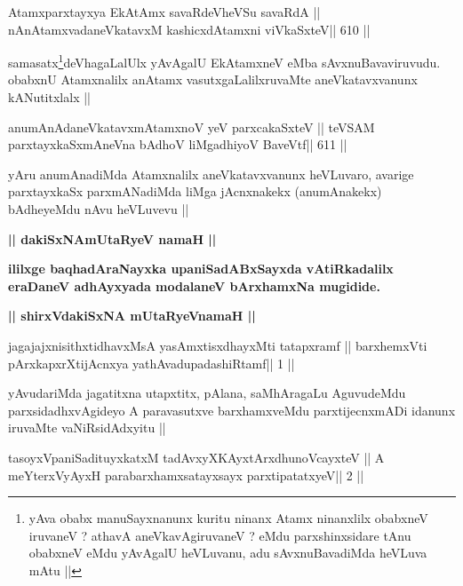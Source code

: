 \begin{shl}
Atamxparxtayxya EkAtAmx savaRdeVheVSu savaRdA ||
nAnAtamxvadaneVkatavxM kashicxdAtamxni viVkaSxteV\hfill || 610 ||
\end{shl}

\begin{artha}
samasatx\footnote[1]{yAva obabx manuSayxnanunx kuritu ninanx Atamx
  ninanxlilx obabxneV iruvaneV ? athavA aneVkavAgiruvaneV ? eMdu
  parxshinxsidare tAnu obabxneV eMdu yAvAgalU heVLuvanu, adu
  sAvxnuBavadiMda heVLuva mAtu ||}deVhagaLalUlx yAvAgalU EkAtamxneV eMba
sAvxnuBavaviruvudu. obabxnU Atamxnalilx anAtamx vasutxgaLalilxruvaMte
aneVkatavxvanunx kANutitxlalx ||
\end{artha}

\begin{shl}
anumAnAdaneVkatavxmAtamxnoV yeV parxcakaSxteV ||
teVSAM parxtayxkaSxmAneVna bAdhoV liMgadhiyoV BaveVtf\hfill || 611 ||
\end{shl}

\begin{artha}
yAru anumAnadiMda Atamxnalilx aneVkatavxvanunx heVLuvaro, avarige
parxtayxkaSx parxmANadiMda liMga jAcnxnakekx (anumAnakekx) bAdheyeMdu
nAvu heVLuvevu ||
\end{artha}


\begin{center}
{\Large{\textbf{|| dakiSxNAmUtaRyeV namaH ||}}}

{\textbf{ililxge baqhadAraNayxka upaniSadABxSayxda vAtiRkadalilx 
eraDaneV
adhAyxyada modalaneV bArxhamxNa mugidide.}}
\end{center}

\begin{center}
{\large{\textbf{|| shirxVdakiSxNA mUtaRyeVnamaH ||}}}
\end{center}

\begin{shl}
jagajajxnisithxtidhavxMsA yasAmxtisxdhayxMti tatapxramf ||
barxhemxVti pArxkapxrXtijAcnxya yathAvadupadashiRtamf\hfill || 1 ||
\end{shl}

\begin{artha}
yAvudariMda jagatitxna utapxtitx, pAlana, saMhAragaLu AguvudeMdu
parxsidadhxvAgideyo A paravasutxve barxhamxveMdu parxtijecnxmADi
idanunx iruvaMte vaNiRsidAdxyitu || 
\end{artha}

\begin{shl}
tasoyxVpaniSadituyxkatxM tadAvxyXKAyx\s tArxdhunoVcayxteV ||
A meYterxVyAyxH parabarxhamxsatayxsayx parxtipatatxyeV\hfill || 2 ||
\end{shl}

